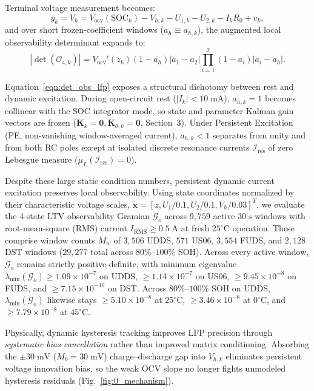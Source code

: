 \documentclass[10pt,a4paper]{article}
\begin{document}
Terminal voltage measurement becomes:
\begin{equation}\label{eqn:vt_lfp}
y_k = V_k = V_{\text{ocv}}(\text{SOC}_k) - V_{h,k} - U_{1,k} - U_{2,k} - I_k R_0 + v_k,
\end{equation}
and over short frozen-coefficient windows ($a_h \equiv a_{h,k}$), the augmented local observability determinant expands to:
\begin{equation}\label{eqn:det_obs_lfp}
|\det(\mathcal{O}_{4,k})| = V_{\text{ocv}}'(z_k)(1 - a_h)|a_1 - a_2|\prod_{i=1}^2 (1 - a_i)|a_i - a_h|.
\end{equation}

Equation~\eqref{eqn:det_obs_lfp} exposes a structural dichotomy between rest and dynamic excitation. During open-circuit rest ($|I_k| < 10\;\mathrm{mA}$), $a_{h,k} = 1$ becomes collinear with the SOC integrator mode, so state and parameter Kalman gain vectors are frozen ($\mathbf{K}_k = \mathbf{0}, \mathbf{K}_{\theta,k} = \mathbf{0}$, Section~3). Under Persistent Excitation (PE, non-vanishing window-averaged current), $a_{h,k} < 1$ separates from unity and from both RC poles except at isolated discrete resonance currents $\mathcal{I}_{\text{res}}$ of zero Lebesgue measure ($\mu_L(\mathcal{I}_{\text{res}}) = 0$).

Despite these large static condition numbers, persistent dynamic current excitation preserves local observability. Using state coordinates normalized by their characteristic voltage scales, $\tilde{\mathbf{x}} = [z, U_1/0.1, U_2/0.1, V_h/0.03]^T$, we evaluate the 4-state LTV observability Gramian $\mathcal{G}_o$ across $9,759$ active $30\;\mathrm{s}$ windows with root-mean-square (RMS) current $I_{\text{RMS}} \ge 0.5\;\mathrm{A}$ at fresh $25^\circ\text{C}$ operation. These comprise window counts $M_w$ of $3,506$ UDDS, $571$ US06, $3,554$ FUDS, and $2,128$ DST windows ($29,277$ total across $80\%\text{--}100\%$ SOH). Across every active window, $\mathcal{G}_o$ remains strictly positive-definite, with minimum eigenvalue $\lambda_{\min}(\mathcal{G}_o) \ge 1.09 \times 10^{-7}$ on UDDS, $\ge 1.14 \times 10^{-7}$ on US06, $\ge 9.45 \times 10^{-8}$ on FUDS, and $\ge 7.15 \times 10^{-10}$ on DST. Across $80\%\text{--}100\%$ SOH on UDDS, $\lambda_{\min}(\mathcal{G}_o)$ likewise stays $\ge 5.10 \times 10^{-8}$ at $25^\circ\text{C}$, $\ge 3.46 \times 10^{-8}$ at $0^\circ\text{C}$, and $\ge 7.79 \times 10^{-8}$ at $45^\circ\text{C}$.

Physically, dynamic hysteresis tracking improves LFP precision through \emph{systematic bias cancellation} rather than improved matrix conditioning. Absorbing the $\pm 30\;\mathrm{mV}$ ($M_0 = 30\;\mathrm{mV}$) charge--discharge gap into $V_{h,k}$ eliminates persistent voltage innovation bias, so the weak OCV slope no longer fights unmodeled hysteresis residuals (Fig.~\ref{fig:0_mechanism}).
\end{document}
